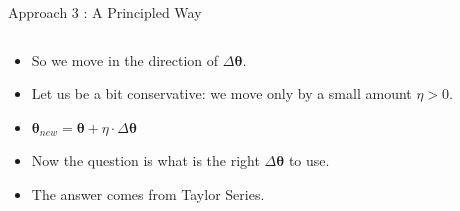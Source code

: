 \documentclass[10pt, aspectratio=169]{beamer}
\begin{document}
\begin{frame}{Approach 3 : A Principled Way}
\begin{columns}
\begin{column}{0.5\textwidth}
\begin{itemize}
\item<3-> So we move in the direction of $\Delta\symbf{\theta}$.

\item<4-> Let us be a bit conservative: we move only by a small amount $\eta > 0$.

\item<5-> $\symbf{\theta}_{new} = \symbf{\theta} + \eta \cdot \Delta\symbf{\theta}$

\item<6-> Now the question is what is the right $\Delta\symbf{\theta}$ to use. 

\item<7-> The answer comes from Taylor Series.
\end{itemize}
\end{column}
\end{columns}

\end{frame}

\begin{frame}

\end{frame}
\end{document}
